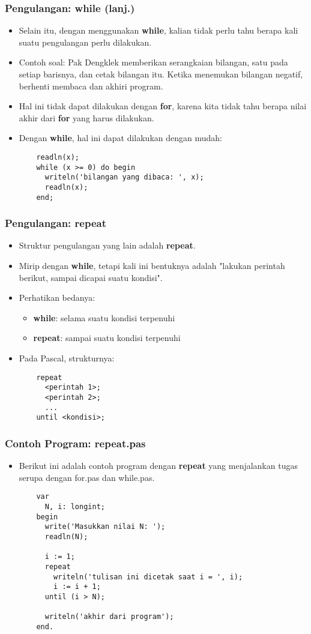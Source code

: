 \begin{frame}[fragile]
\frametitle{Pengulangan: while (lanj.)}
\begin{itemize}
  \item Selain itu, dengan menggunakan \textbf{while}, kalian tidak perlu tahu berapa kali suatu pengulangan perlu dilakukan.
  \item Contoh soal: Pak Dengklek memberikan serangkaian bilangan, satu pada setiap barisnya, dan cetak bilangan itu. Ketika menemukan bilangan negatif, berhenti membaca dan akhiri program.
  \item Hal ini tidak dapat dilakukan dengan \textbf{for}, karena kita tidak tahu berapa nilai akhir dari \textbf{for} yang harus dilakukan.
  \item Dengan \textbf{while}, hal ini dapat dilakukan dengan mudah:
  \begin{lstlisting}
    readln(x);
    while (x >= 0) do begin
      writeln('bilangan yang dibaca: ', x);
      readln(x);
    end;
  \end{lstlisting}
\end{itemize}
\end{frame}

\begin{frame}[fragile]
\frametitle{Pengulangan: repeat}
\begin{itemize}
  \item Struktur pengulangan yang lain adalah \textbf{repeat}.
  \item Mirip dengan \textbf{while}, tetapi kali ini bentuknya adalah "lakukan perintah berikut, sampai dicapai suatu kondisi".
  \item Perhatikan bedanya:
  \begin{itemize}
    \item \textbf{while}: selama suatu kondisi terpenuhi
    \item \textbf{repeat}: sampai suatu kondisi terpenuhi
  \end{itemize}
  \item Pada Pascal, strukturnya:
  \begin{lstlisting}
    repeat
      <perintah 1>;
      <perintah 2>;
      ...
    until <kondisi>;
  \end{lstlisting}
\end{itemize}
\end{frame}

\begin{frame}[fragile]
\frametitle{Contoh Program: repeat.pas}
\begin{itemize}
  \item Berikut ini adalah contoh program dengan \textbf{repeat} yang menjalankan tugas serupa dengan for.pas dan while.pas.
  \begin{lstlisting}
    var
      N, i: longint;
    begin
      write('Masukkan nilai N: ');
      readln(N);

      i := 1;
      repeat
        writeln('tulisan ini dicetak saat i = ', i);
        i := i + 1;
      until (i > N);

      writeln('akhir dari program');
    end.
  \end{lstlisting}
\end{itemize}
\end{frame}

